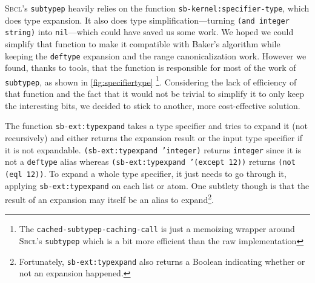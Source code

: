 \documentclass[format=sigconf]{acmart}
\newcommand\code[2][\small]{\sloppy\texttt{#1#2}}
\newcommand\footcode[1]{\code[\scriptsize]{#1}}
\theoremstyle{definition}
\newcommand\sbcl{\textsc{Sbcl}}
\begin{document}
\sbcl's \code{subtypep} heavily relies on the function
\code{sb-kernel:specifier-type}, which does type expansion. It also does
type simplification---turning \code{(and integer string)} into
\code{nil}---which could have saved us some work. We hoped we could simplify
that function to make it compatible with Baker's algorithm while keeping the
\code{deftype} expansion and the range canonicalization work. However we found,
thanks to \cite{newton.18.phd} tools, that the function is responsible for most
of the work of \code{subtypep}, as shown in \vref{fig:specifiertype}
\footnote{The \footcode{cached-subtypep-caching-call} is just a memoizing wrapper
  around \sbcl's \footcode{subtypep} which is a bit more efficient than the raw
  implementation}.
Considering the lack of efficiency of that function and the fact that it would
not be trivial to simplify it to only keep the interesting bits, we decided to
stick to another, more cost-effective solution.

The function \code{sb-ext:typexpand} takes a type specifier and tries to expand
it (not recursively) and either returns the expansion result or the input type
specifier if it is not expandable. \code{(sb-ext:typexpand 'integer)} returns
\code{integer} since it is not a \code{deftype} alias whereas
\code{(sb-ext:typexpand '(except 12))} returns \code{(not (eql 12))}.
To expand a whole type specifier, it just needs to go through it, applying
\code{sb-ext:typexpand} on each list or atom. One subtlety though is that the
result of an expansion may itself be an alias to expand\footnote{Fortunately,
  \footcode{sb-ext:typexpand} also returns a Boolean indicating whether or not
  an expansion happened.}.
\end{document}
